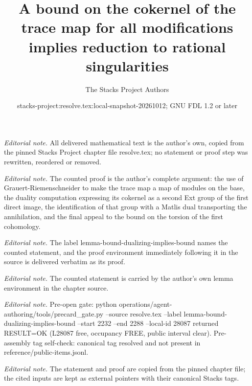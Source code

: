 \documentclass[10pt,a4paper]{amsart}
\title{A bound on the cokernel of the trace map for all modifications implies reduction to rational singularities}
\author{The Stacks Project Authors}
\date{stacks-project:resolve.tex:local-snapshot-20261012; GNU FDL 1.2 or later}
\theoremstyle{plain}
\theoremstyle{definition}
\theoremstyle{remark}
\numberwithin{equation}{subsection}
\begin{document}
\maketitle
\noindent\textit{Editorial note.} All delivered mathematical text is the author's own, copied from the pinned Stacks Project chapter file resolve.tex; no statement or proof step was rewritten, reordered or removed.\par\medskip
\noindent\textit{Editorial note.} The counted proof is the author's complete argument: the use of Grauert-Riemenschneider to make the trace map a map of modules on the base, the duality computation expressing its cokernel as a second Ext group of the first direct image, the identification of that group with a Matlis dual transporting the annihilation, and the final appeal to the bound on the torsion of the first cohomology.\par\medskip
\noindent\textit{Editorial note.} The label lemma-bound-dualizing-implies-bound names the counted statement, and the proof environment immediately following it in the source is delivered verbatim as its proof.\par\medskip
\noindent\textit{Editorial note.} The counted statement is carried by the author's own lemma environment in the chapter source.\par\medskip
\noindent\textit{Editorial note.} Pre-open gate: python operations/agent-authoring/tools/precard\_gate.py --source resolve.tex --label lemma-bound-dualizing-implies-bound --start 2232 --end 2288 --local-id 28087 returned RESULT=OK (L28087 free, occupancy FREE, public interval clear). Pre-assembly tag self-check: canonical tag resolved and not present in reference/public-items.jsonl.\par\medskip
\noindent\textit{Editorial note.} The statement and proof are copied from the pinned chapter file; the cited inputs are kept as external pointers with their canonical Stacks tags.\par\medskip
\end{document}
